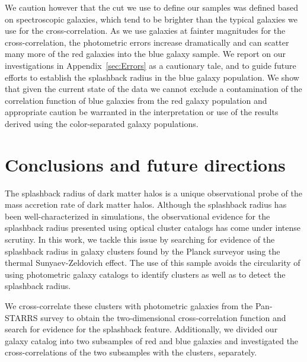 \documentclass[iop, apjl, twocolappendix, numberedappendix]{emulateapj}
\begin{document}
We caution however that the cut we use to define our samples was
defined based on spectroscopic galaxies, which tend to be brighter
than the typical galaxies we use for the cross-correlation. As we use
galaxies at fainter magnitudes for the cross-correlation, the
photometric errors increase dramatically and can scatter many more of
the red galaxies into the blue galaxy sample. We report on
our investigations in Appendix~\ref{sec:Errors} as a cautionary tale,
and to guide future efforts to establish the splashback radius in the
blue galaxy population. We show that given the current state of the
data we cannot exclude a contamination of the correlation function of
blue galaxies from the red galaxy population and appropriate caution
be warranted in the interpretation or use of the results derived using
the color-separated galaxy populations.


\section{Conclusions and future directions}
\label{sec:Conclusions}
The splashback radius of dark matter halos is a unique observational
probe of the mass accretion rate of dark matter halos. Although the
splashback radius has been well-characterized in simulations, the
observational evidence for the splashback radius presented using
optical cluster catalogs has come under intense scrutiny. In this
work, we tackle this issue by searching for evidence of the
splashback radius in galaxy clusters found by the Planck surveyor using
the thermal Sunyaev-Zeldovich effect. The use of this sample avoids
the circularity of using photometric galaxy catalogs to identify
clusters as well as to detect the splashback radius. 

We cross-correlate these clusters with photometric galaxies from the
Pan-STARRS survey to obtain the two-dimensional cross-correlation
function and search for evidence for the splashback feature.
Additionally, we divided our galaxy catalog into two subsamples of
red and blue galaxies and investigated the cross-correlations of the
two subsamples with the clusters, separately.
\end{document}

